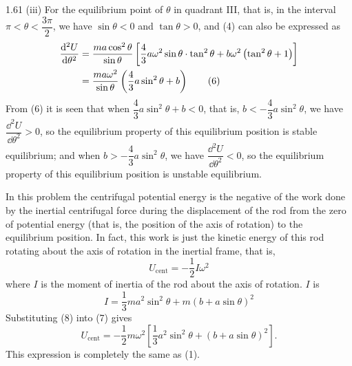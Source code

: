 \begin{solution}{1.61}
(iii) For the equilibrium point of $\theta$ in quadrant III, that is, in the interval $\pi<\theta<\dfrac{3\pi}{2}$, we have $\sin\theta<0$ and $\tan\theta>0$, and (4) can also be expressed as
\begin{align}
\frac{\mathrm{d}^2U}{\mathrm{d}\theta^2}&=\frac{ma\cos^2\theta}{\sin\theta}\left[\frac{4}{3}a\omega^2\sin\theta\cdot\tan^2\theta+b\omega^2\left(\tan^2\theta+1\right)\right]\notag\\
&=\frac{ma\omega^2}{\sin\theta}\left(\frac{4}{3}a\sin^2\theta+b\right) \tag{6}
\end{align}
From (6) it is seen that when $\dfrac{4}{3}a\sin^2\theta+b<0$, that is, $b<-\dfrac{4}{3}a\sin^2\theta$, we have $\dfrac{\dd^2U}{\dd\theta^2}>0$, so the equilibrium property of this equilibrium position is stable equilibrium; and when $b>-\dfrac{4}{3}a\sin^2\theta$, we have $\dfrac{\dd^2U}{\dd\theta^2}<0$, so the equilibrium property of this equilibrium position is unstable equilibrium.

In this problem the centrifugal potential energy is the negative of the work done by the inertial centrifugal force during the displacement of the rod from the zero of potential energy (that is, the position of the axis of rotation) to the equilibrium position. In fact, this work is just the kinetic energy of this rod rotating about the axis of rotation in the inertial frame, that is,
\begin{equation}
U_{\text{cent}}=-\frac{1}{2}I\omega^2 \tag{7}
\end{equation}
where $I$ is the moment of inertia of the rod about the axis of rotation. $I$ is
\begin{equation}
I=\frac{1}{3}ma^2\sin^2\theta+m\left(b+a\sin\theta\right)^2 \tag{8}
\end{equation}
Substituting (8) into (7) gives
\[
U_{\text{cent}}=-\frac{1}{2}m\omega^2\left[\frac{1}{3}a^2\sin^2\theta+\left(b+a\sin\theta\right)^2\right].
\]
This expression is completely the same as (1).

\end{solution}

